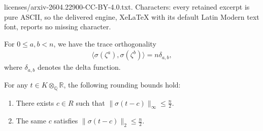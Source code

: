 \documentclass[10pt,a4paper]{amsart}
\newcommand{\Q}{\mathbb{Q}}
\newcommand{\R}{\mathbb{R}}
\begin{document}
licenses/arxiv-2604.22900-CC-BY-4.0.txt. Characters: every retained excerpt is pure ASCII, so the delivered engine, XeLaTeX with its default Latin Modern text font, reports no missing character.
\begin{lemma}\label{lem:orth}
For $0\le a, b < n$, we have the trace orthogonality 
\begin{align}
  \langle\sigma(\zeta^a),\sigma(\zeta^b)\rangle=n \delta_{a,b},
  \label{E:traceorth}
\end{align}
where $\delta_{a,b}$ denotes the delta function.

\end{lemma}

\begin{lemma}\label{lem:cover}
For any $t\in K\otimes_\Q\R$, the following rounding bounds hold:
\begin{enumerate}[label=(\roman*),nosep]
\item There exists $c\in R$ such that $\|\sigma(t-c)\|_\infty \le \frac{n}{2}$.
\item The same $c$ satisfies $\|\sigma(t-c)\|_2 \le \frac{n}{2}$.
\end{enumerate}
\end{lemma}
\end{document}
